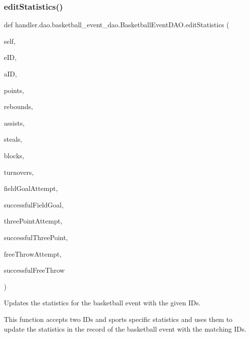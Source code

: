 \subsubsection{\texorpdfstring{edit\+Statistics()}{editStatistics()}}
{\footnotesize\ttfamily def handler.\+dao.\+basketball\+\_\+event\+\_\+dao.\+Basketball\+Event\+D\+A\+O.\+edit\+Statistics (\begin{DoxyParamCaption}\item[{}]{self,  }\item[{}]{e\+ID,  }\item[{}]{a\+ID,  }\item[{}]{points,  }\item[{}]{rebounds,  }\item[{}]{assists,  }\item[{}]{steals,  }\item[{}]{blocks,  }\item[{}]{turnovers,  }\item[{}]{field\+Goal\+Attempt,  }\item[{}]{successful\+Field\+Goal,  }\item[{}]{three\+Point\+Attempt,  }\item[{}]{successful\+Three\+Point,  }\item[{}]{free\+Throw\+Attempt,  }\item[{}]{successful\+Free\+Throw }\end{DoxyParamCaption})}



Updates the statistics for the basketball event with the given I\+Ds. 

This function accepts two I\+Ds and sports specific statistics and uses them to update the statistics in the record of the basketball event with the matching I\+Ds.


